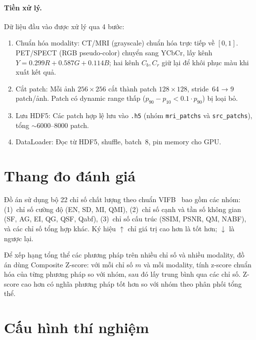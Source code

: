 \paragraph{Tiền xử lý.}
Dữ liệu đầu vào được xử lý qua 4 bước:

\begin{enumerate}\itemsep2pt
    \item Chuẩn hóa modality: CT/MRI (grayscale) chuẩn hóa trực tiếp về $[0,1]$. PET/SPECT (RGB pseudo-color) chuyển sang YCbCr, lấy kênh $Y = 0.299R + 0.587G + 0.114B$; hai kênh $C_b, C_r$ giữ lại để khôi phục màu khi xuất kết quả.
    \item Cắt patch: Mỗi ảnh $256\times256$ cắt thành patch $128\times128$, stride~64 → 9 patch/ảnh. Patch có dynamic range thấp ($p_{90}-p_{10} < 0.1\cdot p_{90}$) bị loại bỏ.
    \item Lưu HDF5: Các patch hợp lệ lưu vào \texttt{.h5} (nhóm \texttt{mri\_patchs} và \texttt{src\_patchs}), tổng $\sim$6000--8000 patch.
    \item DataLoader: Đọc từ HDF5, shuffle, batch~8, pin memory cho GPU.
\end{enumerate}

\section{Thang đo đánh giá}
\label{sec:metrics}

Đồ án sử dụng bộ 22 chỉ số chất lượng theo chuẩn VIFB~\cite{liu2020vifb} bao gồm các nhóm: (1)~chỉ số cường độ (EN, SD, MI, QMI), (2)~chỉ số cạnh và tần số không gian (SF, AG, EI, QG, QSF, Qabf), (3)~chỉ số cấu trúc (SSIM, PSNR, QM, NABF), và các chỉ số tổng hợp khác. Ký hiệu $\uparrow$ chỉ giá trị cao hơn là tốt hơn; $\downarrow$ là ngược lại.

Để xếp hạng tổng thể các phương pháp trên nhiều chỉ số và nhiều modality, đồ án dùng Composite Z-score: với mỗi chỉ số $m$ và mỗi modality, tính z-score chuẩn hóa của từng phương pháp so với nhóm, sau đó lấy trung bình qua các chỉ số. Z-score cao hơn có nghĩa phương pháp tốt hơn so với nhóm theo phân phối tổng thể.

\section{Cấu hình thí nghiệm}
\label{sec:setup}


